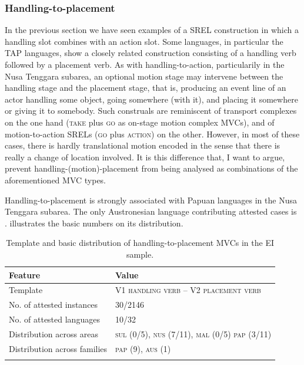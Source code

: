 \subsubsection{Handling-to-placement} \label{sec:handling-to-placement}
In the previous section we have seen examples of a SREL construction in which a handling slot combines with an action slot. Some languages, in particular the \textsc{TAP} languages, show a closely related construction consisting of a handling verb followed by a placement verb. As with handling-to-action, particularily in the Nusa Tenggara subarea, an optional motion stage may intervene between the handling stage and the placement stage, that is, producing an event line of an actor handling some object, going somewhere (with it), and placing it somewhere or giving it to somebody. Such construals are reminiscent of transport complexes on the one hand (\textsc{take} plus \textsc{go} as on-stage motion complex MVCs), and of motion-to-action SRELs (\textsc{go} plus \textsc{action}) on the other. However, in most of these cases, there is hardly translational motion encoded in the sense that there is really a change of location involved. It is this difference that, I want to argue, prevent handling-(motion)-placement from being analysed as combinations of the aforementioned MVC types.

Handling-to-placement is strongly associated with Papuan languages in the Nusa Tenggara subarea. The only Austronesian language contributing attested cases is .  illustrates the basic numbers on its distribution.

\begin{table}
\begin{tabular}{ll}
\lsptoprule
Feature&Value\tabularnewline
\midrule
Template&V1 \textsc{handling verb} -- V2 \textsc{placement verb}\tabularnewline
No. of attested instances& 30/2146 \tabularnewline
No. of attested languages& 10/32 \tabularnewline
Distribution across areas& \textsc{sul} (0/5), \textsc{nus} (7/11), \textsc{mal} (0/5) \textsc{pap} (3/11) \tabularnewline
Distribution across families& \textsc{pap} (9), \textsc{aus} (1) \tabularnewline
\lspbottomrule
\end{tabular}
\caption[Template and basic distribution of handling-to-placement MVCs]{Template and basic distribution of handling-to-placement MVCs in the EI sample.}
\label{table:handling-to-placement}
\end{table}

